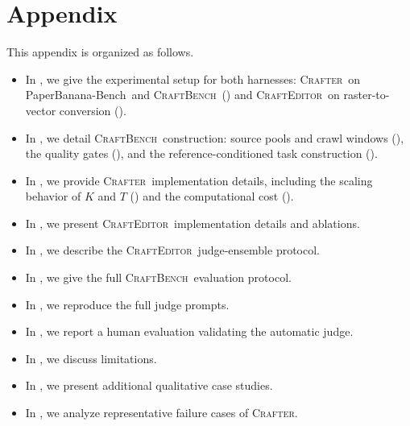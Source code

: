 \documentclass{article}
\newcommand{\Crafter}{\textsc{Crafter}\xspace}
\newcommand{\Editor}{\textsc{CraftEditor}\xspace}
\newcommand{\CrafterBench}{\textsc{CraftBench}\xspace}
\newcommand{\PaperBananaBench}{PaperBanana-Bench\xspace}
\begin{document}
\section{Appendix}
\noindent This appendix is organized as follows.

\begin{itemize}[leftmargin=1.4em,itemsep=2pt,topsep=2pt]
    \item In , we give the experimental setup for both harnesses: \Crafter\ on \PaperBananaBench\ and \CrafterBench\ () and \Editor\ on raster-to-vector conversion ().
    \item In , we detail \CrafterBench\ construction: source pools and crawl windows (), the quality gates (), and the reference-conditioned task construction ().
    \item In , we provide \Crafter\ implementation details, including the scaling behavior of $K$ and $T$ () and the computational cost ().
    \item In , we present \Editor\ implementation details and ablations.
    \item In , we describe the \Editor\ judge-ensemble protocol.
    \item In , we give the full \CrafterBench\ evaluation protocol.
    \item In , we reproduce the full judge prompts.
    \item In , we report a human evaluation validating the automatic judge.
    \item In , we discuss limitations.
    \item In , we present additional qualitative case studies.
    \item In , we analyze representative failure cases of \Crafter.
\end{itemize}

 
\end{document}
